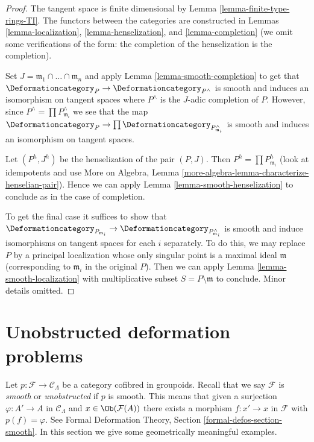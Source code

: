 \begin{proof}
The tangent space is finite dimensional by
Lemma \ref{lemma-finite-type-rings-TI}.
The functors between the categories are constructed
in Lemmas \ref{lemma-localization}, \ref{lemma-henselization}, and
\ref{lemma-completion} (we omit some verifications of the form:
the completion of the henselization is the completion).

\medskip\noindent
Set $J = \mathfrak m_1 \cap \ldots \cap \mathfrak m_n$ and apply
Lemma \ref{lemma-smooth-completion} to get that
$\Deformationcategory_P \to \Deformationcategory_{P^\wedge}$
is smooth and induces an isomorphism on tangent spaces
where $P^\wedge$ is the $J$-adic completion of $P$.
However, since $P^\wedge = \prod P_{\mathfrak m_i}^\wedge$
we see that the map $\Deformationcategory_P \to
\prod \Deformationcategory_{P_{\mathfrak m_i}^\wedge}$
is smooth and induces an isomorphism on tangent spaces.

\medskip\noindent
Let $(P^h, J^h)$ be the henselization of the pair $(P, J)$.
Then $P^h = \prod P_{\mathfrak m_i}^h$ (look at idempotents
and use More on Algebra, Lemma
\ref{more-algebra-lemma-characterize-henselian-pair}).
Hence we can apply Lemma \ref{lemma-smooth-henselization}
to conclude as in the case of completion.

\medskip\noindent
To get the final case it suffices to show that
$\Deformationcategory_{P_{\mathfrak m_i}} \to
\Deformationcategory_{P_{\mathfrak m_i}^\wedge}$
is smooth and induce isomorphisms on tangent spaces for each $i$ separately.
To do this, we may replace $P$ by a principal localization
whose only singular point is a maximal ideal $\mathfrak m$
(corresponding to $\mathfrak m_i$ in the original $P$).
Then we can apply
Lemma \ref{lemma-smooth-localization}
with multiplicative subset $S = P \setminus \mathfrak m$ to conclude.
Minor details omitted.
\end{proof}






\section{Unobstructed deformation problems}
\label{section-unobstructed}

\noindent
Let $p : \mathcal{F} \to \mathcal{C}_\Lambda$ be a
category cofibred in groupoids. Recall that we say $\mathcal{F}$
is {\it smooth} or {\it unobstructed} if $p$ is smooth.
This means that given a surjection $\varphi : A' \to A$ in
$\mathcal{C}_\Lambda$ and $x \in \Ob(\mathcal{F}(A))$
there exists a morphism $f : x' \to x$ in $\mathcal{F}$
with $p(f) = \varphi$.
See Formal Deformation Theory, Section \ref{formal-defos-section-smooth}.
In this section we give some geometrically meaningful examples.

